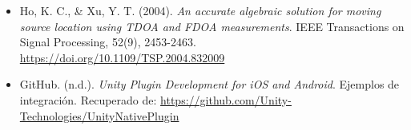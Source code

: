\begin{itemize}
    \item Ho, K. C., \& Xu, Y. T. (2004). \textit{An accurate algebraic solution for moving source location using TDOA and FDOA measurements}. IEEE Transactions on Signal Processing, 52(9), 2453-2463. \url{https://doi.org/10.1109/TSP.2004.832009}
    
    \item GitHub. (n.d.). \textit{Unity Plugin Development for iOS and Android}. Ejemplos de integración. Recuperado de: \url{https://github.com/Unity-Technologies/UnityNativePlugin}
\end{itemize}